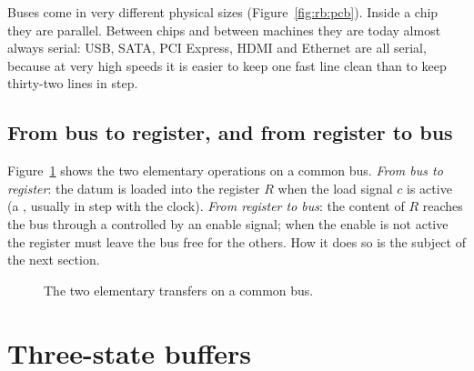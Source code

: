Buses come in very different physical sizes (Figure~\ref{fig:rb:pcb}). Inside
a chip they are parallel. Between chips and between machines they are today
almost always serial: USB, SATA, PCI Express, HDMI and Ethernet are all
serial, because at very high speeds it is easier to keep one fast line clean
than to keep thirty-two lines in step.

\subsection{From bus to register, and from register to bus}

Figure~\ref{fig:rb:busreg} shows the two elementary operations on a common
bus. \emph{From bus to register}: the datum is loaded into the register $R$
when the load signal $c$ is active (a , usually in step with the
clock). \emph{From register to bus}: the content of $R$ reaches the bus
through a  controlled by an enable signal; when the enable is not
active the register must leave the bus free for the others. How it does so is
the subject of the next section.

\begin{figure}[htb]
\centering
{}
\caption{The two elementary transfers on a common bus.}
\label{fig:rb:busreg}
\end{figure}

\section{Three-state buffers}

